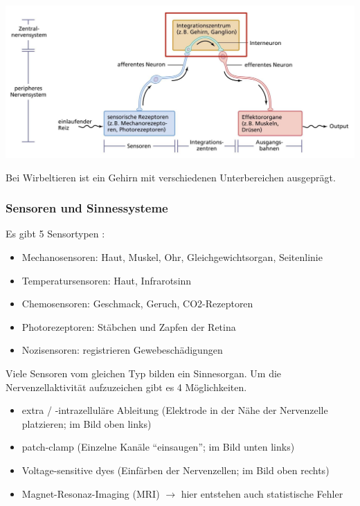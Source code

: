 \begin{center}
    \includegraphics[width=16cm]{lec8/figures/nervensystem.png}
\end{center}
Bei Wirbeltieren ist ein Gehirn mit verschiedenen Unterbereichen ausgeprägt.

\subsubsection{Sensoren und Sinnessysteme}

Es gibt 5 Sensortypen \dangersign:
\begin{itemize}
    \item Mechanosensoren: Haut, Muskel, Ohr, Gleichgewichtsorgan, Seitenlinie
    \item Temperatursensoren: Haut, Infrarotsinn
    \item Chemosensoren: Geschmack, Geruch, CO2-Rezeptoren
    \item Photorezeptoren: Stäbchen und Zapfen der Retina
    \item Nozisensoren: registrieren Gewebeschädigungen
\end{itemize}
Viele Sensoren vom gleichen Typ bilden ein Sinnesorgan. Um die Nervenzellaktivität aufzuzeichen gibt es 4 Möglichkeiten.
\begin{itemize}
    \item extra / -intrazelluläre Ableitung (Elektrode in der Nähe der Nervenzelle platzieren; im Bild oben links)
    \item patch-clamp (Einzelne Kanäle ``einsaugen''; im Bild unten links)
    \item Voltage-sensitive dyes (Einfärben der Nervenzellen; im Bild oben rechts)
    \item Magnet-Resonaz-Imaging (MRI) $\rightarrow$ hier entstehen auch statistische Fehler
\end{itemize}

